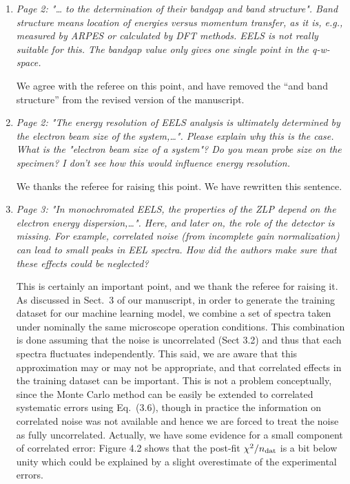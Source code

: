 \documentclass[12pt]{article}
\begin{document}
\begin{enumerate}

\item {\it Page 2: "… to the determination of their bandgap and band structure". Band structure means location of energies versus momentum transfer, as it is, e.g., measured by ARPES or calculated by DFT methods. EELS is not really suitable for this. The bandgap value only gives one single point in the q-w-space.}

  We agree with the referee on this point, and have removed the ``and band structure'' from the revised version
  of the manuscript.
  
\item	{\it Page 2: "The energy resolution of EELS analysis is ultimately determined by the electron beam size of the system,…". Please explain why this is the case. What is the "electron beam size of a system"? Do you mean probe size on the specimen? I don't see how this would influence energy resolution.}

  We thanks the referee for raising this point. We have rewritten
  this sentence.

\item {\it Page 3: "In monochromated EELS, the properties of the ZLP depend on the electron energy dispersion,…". Here, and later on, the role of the detector is missing. For example, correlated noise (from incomplete gain normalization) can lead to small peaks in EEL spectra. How did the authors make sure that these effects could be neglected?}

  This is certainly an important point, and we thank the referee for raising it.
  As discussed in Sect.~3 of our manuscript, in order to generate the training dataset
  for our machine learning model, we combine a set of spectra taken under nominally the
  same microscope operation conditions.
  This combination is done assuming that the noise is uncorrelated (Sect 3.2) and thus
  that each spectra fluctuates independently.
  This said, we are aware that this approximation may or may not be appropriate,
  and that correlated effects in the training dataset can be important.
  This is not a problem conceptually, since the Monte Carlo method can be easily
  be extended to correlated systematic errors
  using Eq.~(3.6), though in practice the information
  on correlated noise was not available and hence we are forced to treat the noise
  as fully uncorrelated.
  Actually, we have some evidence for a small component of correlated error:
  Figure 4.2 shows
  that the post-fit $\chi^2/n_{\rm dat}$ is a bit below unity which could be explained
  by a slight overestimate of the experimental errors.


\end{enumerate}
\end{document}
